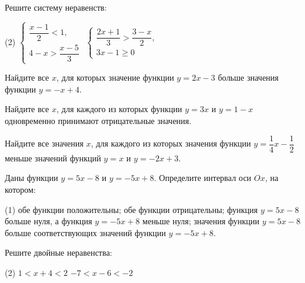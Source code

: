 \begin{class}[number=6]
	\begin{listofex}
		\item Решите систему неравенств:
		\begin{tasks}(2)
			\task \( \left\{
			\begin{array}{l}
				\dfrac{x-1}{2}<1,\\
				4-x>\dfrac{x-5}{3}
			\end{array}
			\right. \)
			\task \( \left\{
			\begin{array}{l}
				\dfrac{2x+1}{3}>\dfrac{3-x}{2},\\
				3x-1\geq0
			\end{array}
			\right. \)
		\end{tasks}
		\item Найдите все \( x \), для которых значение функции \( y=2x-3 \) больше значения функции \( y=-x+4 \).
		\item Найдите все \( x \), для каждого из которых функции \( y=3x \) и \( y=1-x \) одновременно принимают отрицательные значения.
		\item Найдите все значения \( x \), для каждого из которых значения функции \( y=\dfrac{1}{4}x-\dfrac{1}{2} \) меньше значений функций \( y=x \) и \( y=-2x+3 \).
		\item Даны функции \( y=5x-8 \) и \( y=-5x+8 \). Определите интервал оси \( Ox \), на котором:
		\begin{tasks}(1)
			\task обе функции положительны;
			\task обе функции отрицательны;
			\task функция \( y=5x-8 \) больше нуля, а функция \( y=-5x+8 \) меньше нуля;
			\task значения функции \( y=5x-8 \) больше соответствующих значений функции \( y=-5x+8 \).
		\end{tasks}
		\item Решите двойные неравенства:
		\begin{tasks}(2)
			\task \( 1<x+4<2 \)
			\task \( -7<x-6<-2 \)
		\end{tasks}
	\end{listofex}
\end{class}

